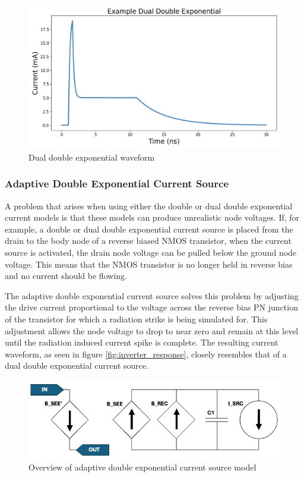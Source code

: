 \documentclass[conference]{IEEEtran}
\begin{document}
    \begin{figure}[htbp]
        \centering
        \includegraphics[width=0.95\linewidth]{EX_Dual_Double_Exponential}
        \caption{Dual double exponential waveform}
        \label{fig:dual_double_exp}
    \end{figure}

    \subsubsection{Adaptive Double Exponential Current Source}
    A problem that arises when using either the double or dual double exponential current models is that these models can produce unrealistic node voltages.
    If, for example, a double or dual double exponential current source is placed from the drain to the body node of a reverse biased NMOS transistor, when the current source is activated, the drain node voltage can be pulled below the ground node voltage.
    This means that the NMOS transistor is no longer held in reverse bias and no current should be flowing.

    The adaptive double exponential current source solves this problem by adjusting the drive current proportional to the voltage across the reverse bias PN junction of the transistor for which a radiation strike is being simulated for.
    This adjustment allows the node voltage to drop to near zero and remain at this level until the radiation induced current spike is complete.
    The resulting current waveform, as seen in figure \ref{fig:inverter_response}, closely resembles that of a dual double exponential current source.

    \begin{figure}[htbp]
        \centering
        \includegraphics[width=0.95\linewidth]{Adaptive_Model_Cropped}
        \caption{Overview of adaptive double exponential current source model \cite{Kauppila2009}}
        \label{fig:adaptive_model_overview}
    \end{figure}
\end{document}
